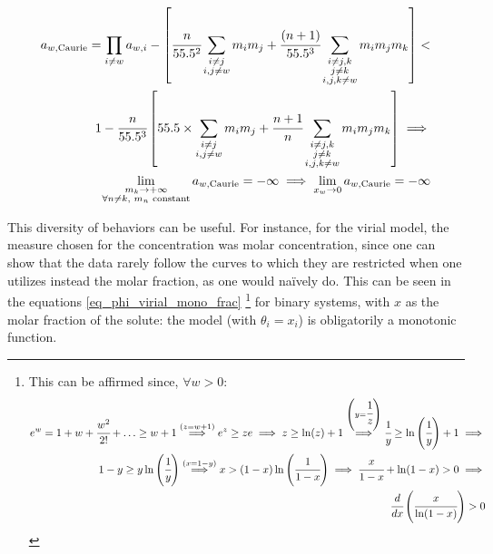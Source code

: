 \begin{equation}
	\label{eq_caurie_fail}
	\begin{split}
		a_{w,\text{Caurie}} = \prod_{i \neq w}a_{w,i} - \left[\cfrac{n}%
			{55.5^2}\sum_{\substack{i \neq j \\ i,j \neq w}}%
			m_im_j + \cfrac{(n+1)}{55.5^3}\sum_{%
			\substack{i\neq j,k \\ j \neq k \\  i,j,k \neq w}}
			m_im_jm_k\right] <\\
		1 - \cfrac{n}{55.5^3}\left[55.5 \times%
			\sum_{\substack{i \neq j \\ i,j \neq w}}%
			m_im_j + \cfrac{n+1}{n}\sum_{%
			\substack{i\neq j,k \\ j \neq k \\  i,j,k \neq w}}
			m_im_jm_k\right]\implies\\
		\lim_{\substack{m_k \to +\infty \\%
				\forall n \neq k, \text{ $m_n$ constant}}}%
			a_{w,\text{Caurie}} = -\infty \implies%
		\lim_{x_w \to 0} a_{w,\text{Caurie}} = -\infty
	\end{split}
\end{equation}

This diversity of behaviors can be useful. For instance, for the virial model,
the measure chosen for the concentration was molar concentration, since one can
show that the data rarely follow the curves to which they are restricted when
one utilizes instead the molar fraction, as one would naïvely do. This can be
seen in the equations \ref{eq_phi_virial_mono_frac}
\footnote{%
	This can be affirmed since, $\forall w > 0$:
	\begin{equation*}
		\begin{split}
			e^w = 1 + w + \cfrac{w^2}{2!} + \ldots \ge w +1
			\stackrel{(z = w+1)}{\implies} e^z \ge ze \implies
				z \ge \ln(z) + 1
			\stackrel{\left(y=\cfrac{1}{z}\right)}{\implies}
				\cfrac{1}{y} \ge
				\ln\left(\cfrac{1}{y}\right) + 1 \implies\\
			1-y \ge y\ln\left(\cfrac{1}{y}\right)
			\stackrel{(x=1-y)}{\implies} x >
				(1-x)\ln\left(\cfrac{1}{1-x}\right)\implies
			\cfrac{x}{1-x} + \ln(1-x) > 0 \implies\\
				\cfrac{d}{dx}\left(\cfrac{x}{\ln(1-x)}\right) > 0
		\end{split}
	\end{equation*}
}
for binary systems, with $x$ as the molar fraction of the solute: the model
(with $\theta_i = x_i$) is obligatorily a monotonic function.

